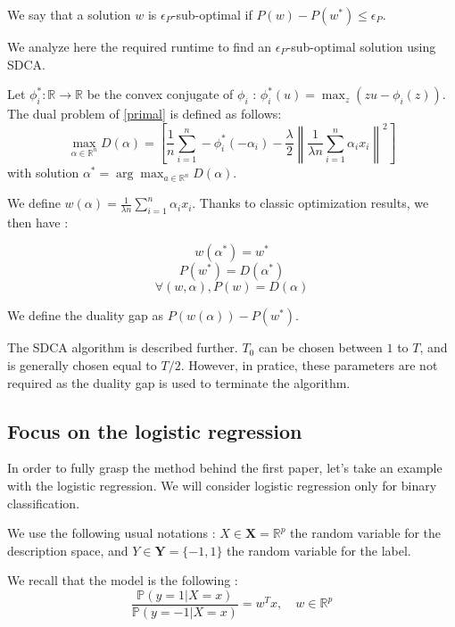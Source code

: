 \documentclass{article}
\newcommand{\norm}[1]{\left\|#1 \right\|}
\begin{document}
We say that a solution $w$ is $\epsilon_P$-sub-optimal if $P(w) - P(w^{*}) \leq \epsilon_P$.

We analyze here the required runtime to find an $\epsilon_P$-sub-optimal solution using SDCA.

Let $\phi_i^{*} : \mathbb{R} \rightarrow \mathbb{R}$ be the convex conjugate of $\phi_i$ : $\phi_i^{*}(u) = \max_z (zu-\phi_i(z))$.
The dual problem of \eqref{primal} is defined as follows:
\begin{equation}
    \max_{\alpha \in \mathbb{R}^n} D(\alpha) = \left[ \dfrac{1}{n} \sum_{i=1}^n -\phi_i^{*}(-\alpha_i) - \dfrac{\lambda}{2}\norm{\dfrac{1}{\lambda n}\sum_{i=1}^n \alpha_ix_i}^2 \right]
    \label{dual}
\end{equation}
with solution $\alpha^{*} = \arg \max_{a \in \mathbb{R}^n} D(\alpha)$.

We define $w(\alpha) = \frac{1}{\lambda n} \sum_{i=1}^n \alpha_ix_i$.
Thanks to classic optimization results, we then have :

\begin{equation}
	w(\alpha^{*}) = w^{*}
\end{equation}
\begin{equation}
	P(w^{*}) = D(\alpha^{*})
\end{equation}
\begin{equation}
	\forall (w,\alpha), P(w) = D(\alpha)
\end{equation}

We define the duality gap as $P(w(\alpha)) - P(w^{*})$.

The SDCA algorithm is described further.
$T_0$ can be chosen between $1$ to $T$, and is generally chosen equal to $T/2$.
However, in pratice, these parameters are not required as the duality gap is used to terminate the algorithm.

\subsection{Focus on the logistic regression}

In order to fully grasp the method behind the first paper, let's take an example with the logistic regression.
We will consider logistic regression only for binary classification.

We use the following usual notations : $X \in \mathbf{X} = \mathbb{R}^p$ the random variable for the description space, and $Y \in \mathbf{Y} = \{-1,1\}$ the random variable for the label.

We recall that the model is the following :
\begin{equation}
	\frac{\mathbb{P}(y=1 | X=x)}{\mathbb{P}(y=-1 |X=x)} = w^T x, \quad w \in \mathbb{R}^p
\end{equation}
\end{document}

